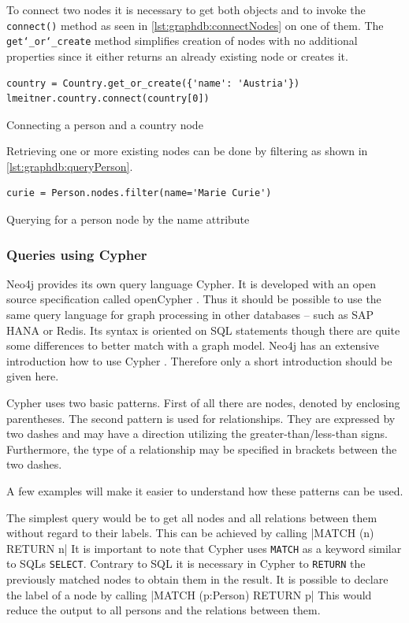 To connect two nodes it is necessary to get both objects and to invoke the \texttt{connect()} method as seen in \autoref{lst:graphdb:connectNodes} on one of them.
The \texttt{get\char`_or\char`_create} method simplifies creation of nodes with no additional properties since it either returns an already existing node or creates it.
\begin{listing}[H]
\begin{verbatim}
country = Country.get_or_create({'name': 'Austria'})
lmeitner.country.connect(country[0])
\end{verbatim}
\caption{Connecting a person and a country node}
\label{lst:graphdb:connectNodes}
\end{listing}

Retrieving one or more existing nodes can be done by filtering as shown in \autoref{lst:graphdb:queryPerson}.
\begin{listing}[H]
\begin{verbatim}
curie = Person.nodes.filter(name='Marie Curie')
\end{verbatim}
\caption{Querying for a person node by the name attribute}
\label{lst:graphdb:queryPerson}
\end{listing}

\subsubsection{Queries using Cypher}
\label{sec:graphdb:cypher}
Neo4j provides its own query language Cypher. It is developed with an open source specification called openCypher \autocite{openCypher}.
Thus it should be possible to use the same query language for graph processing in other databases -- such as SAP HANA or Redis.
Its syntax is oriented on SQL statements though there are quite some differences to better match with a graph model.
Neo4j has an extensive introduction how to use Cypher \autocite{neo4j:cypher_introduction}.
Therefore only a short introduction should be given here.

Cypher uses two basic patterns.
First of all there are nodes, denoted by enclosing parentheses.
The second pattern is used for relationships.
They are expressed by two dashes and may have a direction utilizing the greater-than/less-than signs.
Furthermore, the type of a relationship may be specified in brackets between the two dashes.

A few examples will make it easier to understand how these patterns can be used.

The simplest query would be to get all nodes and all relations between them without regard to their labels.
This can be achieved by calling |MATCH (n) RETURN n|
It is important to note that Cypher uses \texttt{MATCH} as a keyword similar to SQLs \texttt{SELECT}.
Contrary to SQL it is necessary in Cypher to \texttt{RETURN} the previously matched nodes to obtain them in the result.
It is possible to declare the label of a node by calling |MATCH (p:Person) RETURN p|
This would reduce the output to all persons and the relations between them.

